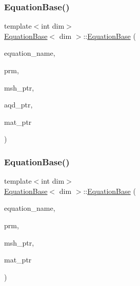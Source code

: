 \subsubsection{\texorpdfstring{Equation\+Base()}{EquationBase()}\hspace{0.1cm}{\footnotesize\ttfamily [1/2]}}
{\footnotesize\ttfamily template$<$int dim$>$ \\
\hyperlink{class_equation_base}{Equation\+Base}$<$ dim $>$\+::\hyperlink{class_equation_base}{Equation\+Base} (\begin{DoxyParamCaption}\item[{std\+::string}]{equation\+\_\+name,  }\item[{const Parameter\+Handler \&}]{prm,  }\item[{const std\+\_\+cxx11\+::shared\+\_\+ptr$<$ \hyperlink{class_mesh_generator}{Mesh\+Generator}$<$ dim $>$ $>$}]{msh\+\_\+ptr,  }\item[{const std\+\_\+cxx11\+::shared\+\_\+ptr$<$ \hyperlink{class_a_q_base}{A\+Q\+Base}$<$ dim $>$ $>$}]{aqd\+\_\+ptr,  }\item[{const std\+\_\+cxx11\+::shared\+\_\+ptr$<$ \hyperlink{class_material_properties}{Material\+Properties} $>$}]{mat\+\_\+ptr }\end{DoxyParamCaption})}

\mbox{\label{class_equation_base_a5e3fdb508c7aa186117ae81883ef1c59}} 
\subsubsection{\texorpdfstring{Equation\+Base()}{EquationBase()}\hspace{0.1cm}{\footnotesize\ttfamily [2/2]}}
{\footnotesize\ttfamily template$<$int dim$>$ \\
\hyperlink{class_equation_base}{Equation\+Base}$<$ dim $>$\+::\hyperlink{class_equation_base}{Equation\+Base} (\begin{DoxyParamCaption}\item[{std\+::string}]{equation\+\_\+name,  }\item[{const Parameter\+Handler \&}]{prm,  }\item[{const std\+\_\+cxx11\+::shared\+\_\+ptr$<$ \hyperlink{class_mesh_generator}{Mesh\+Generator}$<$ dim $>$ $>$}]{msh\+\_\+ptr,  }\item[{const std\+\_\+cxx11\+::shared\+\_\+ptr$<$ \hyperlink{class_material_properties}{Material\+Properties} $>$}]{mat\+\_\+ptr }\end{DoxyParamCaption})}

